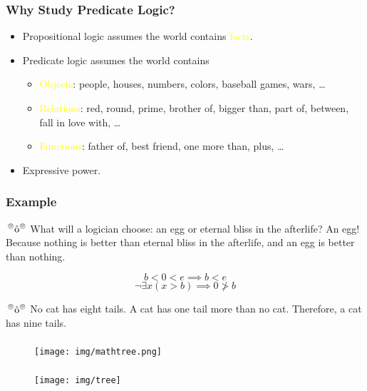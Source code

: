 \documentclass[UTF8,aspectratio=43,11pt,colorlinks,compress,openany]{beamer}%
\begin{document}
\begin{frame}\frametitle{Why Study Predicate Logic?}
	\begin{itemize}
		\item Propositional logic assumes the world contains \textcolor{yellow}{facts}.
		\item Predicate logic assumes the world contains
		\begin{itemize}
			\item \textcolor{yellow}{Objects}: people, houses, numbers, colors, baseball games, wars, \dots
			\item \textcolor{yellow}{Relations}: red, round, prime, brother of, bigger than, part of, between, fall in love with, \dots
			\item \textcolor{yellow}{Functions}: father of, best friend, one more than, plus, \dots
		\end{itemize}
		\item Expressive power.
	\end{itemize}
\end{frame}

\begin{frame}\frametitle{Example}
	\begin{block}{$\sideset{^\circledcirc}{^\circledcirc}{\operatorname{\hat{o}}}$}
		What will a logician choose: an egg or eternal bliss in the afterlife? An egg! Because nothing is better than eternal bliss in the afterlife, and an egg is better than nothing.
	\end{block}
	\[b<0<e\implies b<e\]
	\[\neg\exists x(x>b)\implies 0\ngtr b\]
	\begin{block}{$\sideset{^\circledcirc}{^\circledcirc}{\operatorname{\hat{o}}}$}
		No cat has eight tails. A cat has one tail more than no cat. Therefore, a cat has nine tails.
	\end{block}
\end{frame}

\begin{frame}\frametitle{}
	\begin{figure}
		\texttt{[image: img/mathtree.png]}
	\end{figure}
\end{frame}

\begin{frame}\frametitle{}
	\begin{figure}
		\texttt{[image: img/tree]}
	\end{figure}
\end{frame}
\end{document}
